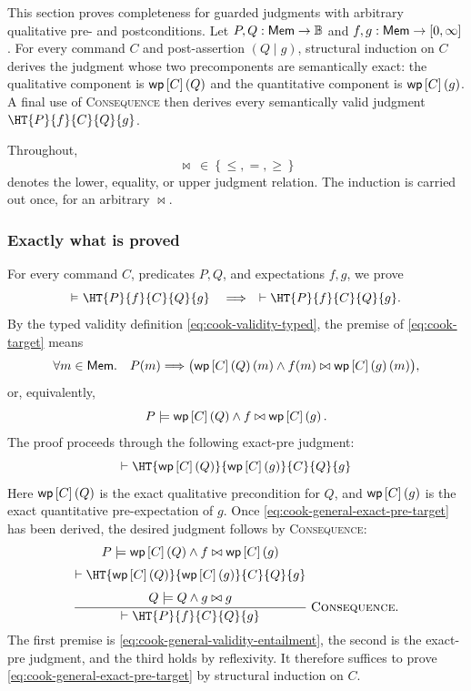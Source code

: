 This section proves completeness for guarded judgments with arbitrary
qualitative pre- and postconditions.  Let
$P,Q:\mathsf{Mem}\to\mathbb{B}$ and $f,g:\mathsf{Mem}\to[0,\infty]$.  For every command $C$ and
post-assertion $(Q\mid g)$, structural induction on $C$ derives the judgment
whose two precomponents are semantically exact: the qualitative component is
$\mathsf{wp}\left[{C}\right]\left({Q}\right)$ and the quantitative component is $\mathsf{wp}\left[{C}\right]\left({g}\right)$.  A final use of
\textsc{Consequence} then derives every semantically valid judgment
$\HT{P}{f}{C}{Q}{g}$.

Throughout,
\[
  \bowtie\ \in\ \{\,\leq,=,\geq\,\}
\]
denotes the lower, equality, or upper judgment relation. The induction is
carried out once, for an arbitrary $\bowtie$.

\subsubsection{Exactly what is proved}

For every command $C$, predicates $P,Q$, and expectations $f,g$, we prove
\begin{equation}
  \valid\HT{P}{f}{C}{Q}{g}
  \quad\Longrightarrow\quad
  \vdash\HT{P}{f}{C}{Q}{g}.
  \label{eq:cook-target}
\end{equation}
By the typed validity definition \eqref{eq:cook-validity-typed}, the premise of
\eqref{eq:cook-target} means
\begin{equation}
  \forall m\in\mathsf{Mem}.\quad
  P(m)\Longrightarrow
  \bigl(\mathsf{wp}\left[{C}\right]\left({Q}\right)(m)\land
        f(m)\bowtie\mathsf{wp}\left[{C}\right]\left({g}\right)(m)\bigr),
  \label{eq:cook-general-validity}
\end{equation}
or, equivalently,
\begin{equation}
  P\models \mathsf{wp}\left[{C}\right]\left({Q}\right)\land f\bowtie\mathsf{wp}\left[{C}\right]\left({g}\right).
  \label{eq:cook-general-validity-entailment}
\end{equation}
The proof proceeds through the following exact-pre judgment:
\begin{equation}
  \vdash
  \HT{\WP{C}{Q}}{\WP{C}{g}}{C}{Q}{g}
  \label{eq:cook-general-exact-pre-target}
\end{equation}
Here $\mathsf{wp}\left[{C}\right]\left({Q}\right)$ is the exact qualitative precondition for $Q$, and
$\mathsf{wp}\left[{C}\right]\left({g}\right)$ is the exact quantitative pre-expectation of $g$.  Once
\eqref{eq:cook-general-exact-pre-target} has been derived, the desired judgment
follows by \textsc{Consequence}:
\begin{equation}
\frac{
  \begin{gathered}
    P\models\WP{C}{Q}\land f\bowtie\WP{C}{g}
    \\[1mm]
    \vdash\HT{\WP{C}{Q}}{\WP{C}{g}}{C}{Q}{g}
    \\[1mm]
    Q\models Q\land g\bowtie g
  \end{gathered}
}{
  \vdash\HT{P}{f}{C}{Q}{g}
}\;\textsc{Consequence}.
\label{eq:cook-general-final-consequence-outline}
\end{equation}
The first premise is \eqref{eq:cook-general-validity-entailment}, the second is
the exact-pre judgment, and the third holds by reflexivity.  It therefore
suffices to prove \eqref{eq:cook-general-exact-pre-target} by structural
induction on $C$.


